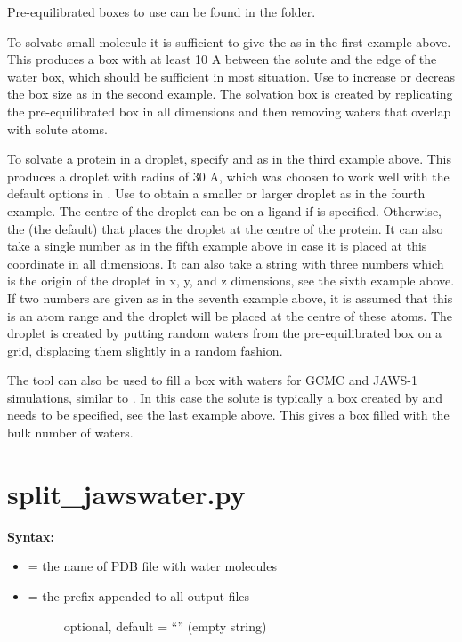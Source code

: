 \documentclass[letterpaper,10pt,english]{sphinxmanual}
\begin{document}
Pre-equilibrated boxes to use can be found in the  folder.

To solvate small molecule it is sufficient to give the  as in the first example above. This produces a box with at least 10 A between the solute and the edge of the water box, which should be sufficient in most situation. Use  to increase or decreas the box size as in the second example. The solvation box is created by replicating the pre-equilibrated box in all dimensions and then removing waters that overlap with solute atoms.

To solvate a protein in a droplet, specify  and  as in the third example above. This produces a droplet with radius of 30 A, which was choosen to work well with the default options in . Use  to obtain a smaller or larger droplet as in the fourth example. The centre of the droplet can be on a ligand if  is specified. Otherwise, the  (the default) that places the droplet at the centre of the protein. It can also take a single number as in the fifth example above in case it is placed at this coordinate in all dimensions. It can also take a string with three numbers which is the origin of the droplet in x, y, and z dimensions, see the sixth example above. If two numbers are given as in the seventh example above, it is assumed that this is an atom range and the droplet will be placed at the centre of these atoms. The droplet is created by putting random waters from the pre-equilibrated box on a grid, displacing them slightly in a random fashion.

The tool can also be used to fill a box with waters for GCMC and JAWS-1 simulations, similar to . In this case the solute is typically a box created by  and  needs to be specified, see the last example above. This gives a box filled with the bulk number of waters.


\section{split\_jawswater.py}
\label{tools:split-jawswater-py}
\textbf{Syntax:}

\begin{itemize}
\item {} 
 = the name of PDB file with water molecules

\item {} \begin{description}
\item[{ = the prefix appended to all output files}] \leavevmode
optional, default = ``'' (empty string)

\end{description}

\end{itemize}
\end{document}
